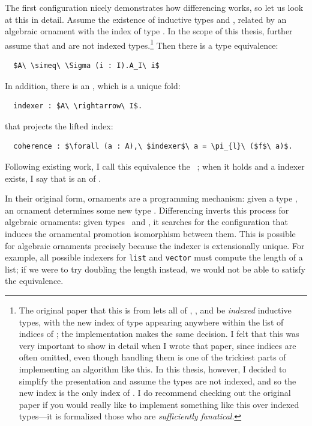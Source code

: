 The first configuration nicely demonstrates how differencing works, so let us look at this in detail.
Assume the existence of inductive types \Aa and \AI, related by an algebraic ornament with the index of type \I.
In the scope of this thesis, further assume that \Aa and \I are not indexed types.\footnote{The original paper that this is from lets all of \Aa,
\AI, and \I be \textit{indexed} inductive types, with the new index of type \I appearing anywhere within the list of indices of \AI;
the implementation makes the same decision.
I felt that this was very important to show in detail when I wrote that paper, since indices are often omitted,
even though handling them is one of the trickiest parts of implementing an algorithm like this.
In this thesis, however, I decided to simplify the presentation and assume the types are not indexed,
and so the new index is the only index of \AI.
I do recommend checking out the original paper if you would really like to implement something like this over indexed types---it is formalized
those who are \textit{sufficiently fanatical}.}
Then there is a type equivalence:

\begin{lstlisting}
  $A\ \simeq\ \Sigma (i : I).A_I\ i$
\end{lstlisting}
In addition, there is an , which is a unique fold:

\begin{lstlisting}
  indexer : $A\ \rightarrow\ I$.
\end{lstlisting}
that projects the lifted index:

\begin{lstlisting}
  coherence : $\forall (a : A),\ $indexer$\ a = \pi_{l}\ ($f$\ a)$.
\end{lstlisting}
Following existing work, I call this equivalence the ~\cite{ko2016programming}; 
when it holds and a  indexer exists, I say that \AI is an  of \Aa.

In their original form, ornaments are a programming mechanism: given a type \Aa, an ornament determines
some new type \AI. Differencing inverts this process for algebraic ornaments: given types \Aa\ and \AI, 
it searches for the configuration that induces the ornamental promotion isomorphism between them.
This is possible for algebraic ornaments precisely because the indexer is extensionally unique.
For example, all possible indexers for \lstinline{list} and \lstinline{vector} must compute
the length of a list; if we were to try doubling the length instead, we would not be able to satisfy the equivalence.

